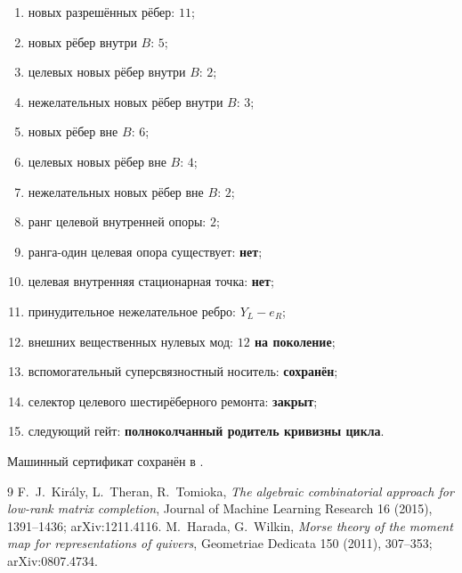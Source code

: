 \begin{protocol}
\begin{enumerate}
 \item новых разрешённых рёбер: \textbf{$11$};
 \item новых рёбер внутри $B$: \textbf{$5$};
 \item целевых новых рёбер внутри $B$: \textbf{$2$};
 \item нежелательных новых рёбер внутри $B$: \textbf{$3$};
 \item новых рёбер вне $B$: \textbf{$6$};
 \item целевых новых рёбер вне $B$: \textbf{$4$};
 \item нежелательных новых рёбер вне $B$: \textbf{$2$};
 \item ранг целевой внутренней опоры: \textbf{$2$};
 \item ранга-один целевая опора существует: \textbf{нет};
 \item целевая внутренняя стационарная точка: \textbf{нет};
 \item принудительное нежелательное ребро: \textbf{$Y_L-e_R$};
 \item внешних вещественных нулевых мод: \textbf{$12$ на поколение};
 \item вспомогательный суперсвязностный носитель: \textbf{сохранён};
 \item селектор целевого шестирёберного ремонта: \textbf{закрыт};
 \item следующий гейт: \textbf{полноколчанный родитель кривизны цикла}.
\end{enumerate}
\end{protocol}

Машинный сертификат сохранён в
.

\begin{thebibliography}{9}
F.~J.~Kir\'aly, L.~Theran, R.~Tomioka,
\emph{The algebraic combinatorial approach for low-rank matrix completion},
Journal of Machine Learning Research 16 (2015), 1391--1436;
arXiv:1211.4116.
M.~Harada, G.~Wilkin,
\emph{Morse theory of the moment map for representations of quivers},
Geometriae Dedicata 150 (2011), 307--353; arXiv:0807.4734.
\end{thebibliography}